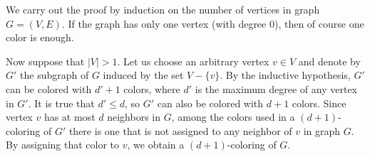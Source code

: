 \subproblem
We carry out the proof by induction on the number of vertices in graph $G=(V,E)$.
If the graph has only one vertex (with degree 0), then of course one color is enough.

Now suppose that $|V|>1$.
Let us choose an arbitrary vertex $v\in V$ and denote by $G'$ the subgraph of $G$ induced by the set $V-\{v\}$.
By the inductive hypothesis, $G'$ can be colored with $d'+1$ colors, where $d'$ is the maximum degree of any vertex in $G'$.
It is true that $d'\le d$, so $G'$ can also be colored with $d+1$ colors.
Since vertex $v$ has at most $d$ neighbors in $G$, among the colors used in a
$(d+1)$-coloring of $G'$ there is one that is not assigned to any neighbor of $v$ in graph $G$.
By assigning that color to $v$, we obtain a $(d+1)$-coloring of $G$.

